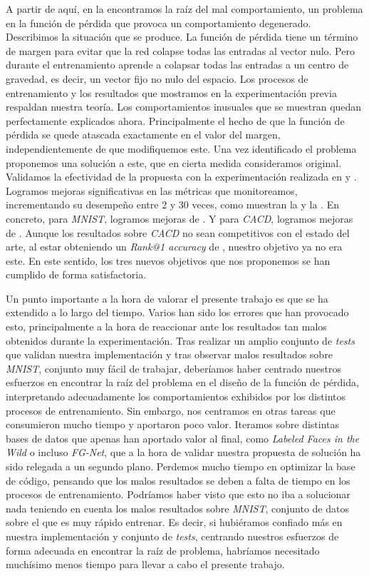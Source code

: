 A partir de aquí, en la \sectionref{} encontramos la raíz del mal comportamiento, un problema en la función de pérdida que provoca un comportamiento degenerado. Describimos la situación que se produce. La función de pérdida tiene un término de margen para evitar que la red colapse todas las entradas al vector nulo. Pero durante el entrenamiento aprende a colapsar todas las entradas a un centro de gravedad, es decir, un vector fijo no nulo del espacio. Los procesos de entrenamiento y los resultados que mostramos en la experimentación previa respaldan nuestra teoría. Los comportamientos inusuales que se muestran quedan perfectamente explicados ahora. Principalmente el hecho de que la función de pérdida se quede atascada exactamente en el valor del margen, independientemente de que modifiquemos este. Una vez identificado el problema proponemos una solución a este, que en cierta medida consideramos original. Validamos la efectividad de la propuesta con la experimentación realizada en \sectionref{} y \sectionref{}. Logramos mejoras significativas en las métricas que monitoreamos, incrementando su desempeño entre 2 y 30 veces, como muestran la \tableref{} y la \tableref{}. En concreto, para \textit{MNIST}, logramos mejoras de . Y para \textit{CACD}, logramos mejoras de . Aunque los resultados sobre \textit{CACD} no sean competitivos con el estado del arte, al estar obteniendo un \textit{Rank@1 accuracy} de , nuestro objetivo ya no era este. En este sentido, los tres nuevos objetivos que nos proponemos se han cumplido de forma satisfactoria.

Un punto importante a la hora de valorar el presente trabajo es que se ha extendido a lo largo del tiempo. Varios han sido los errores que han provocado esto, principalmente a la hora de reaccionar ante los resultados tan malos obtenidos durante la experimentación. Tras realizar un amplio conjunto de \textit{tests} que validan nuestra implementación y tras observar malos resultados sobre \textit{MNIST}, conjunto muy fácil de trabajar, deberíamos haber centrado nuestros esfuerzos en encontrar la raíz del problema en el diseño de la función de pérdida, interpretando adecuadamente los comportamientos exhibidos por los distintos procesos de entrenamiento. Sin embargo, nos centramos en otras tareas que consumieron mucho tiempo y aportaron poco valor. Iteramos sobre distintas bases de datos que apenas han aportado valor al final, como \textit{Labeled Faces in the Wild} o incluso \textit{FG-Net}, que a la hora de validar nuestra propuesta de solución ha sido relegada a un segundo plano. Perdemos mucho tiempo en optimizar la base de código, pensando que los malos resultados se deben a falta de tiempo en los procesos de entrenamiento. Podríamos haber visto que esto no iba a solucionar nada teniendo en cuenta los malos resultados sobre \textit{MNIST}, conjunto de datos sobre el que es muy rápido entrenar. Es decir, si hubiéramos confiado más en nuestra implementación y conjunto de \textit{tests}, centrando nuestros esfuerzos de forma adecuada en encontrar la raíz de problema, habríamos necesitado muchísimo menos tiempo para llevar a cabo el presente trabajo.

